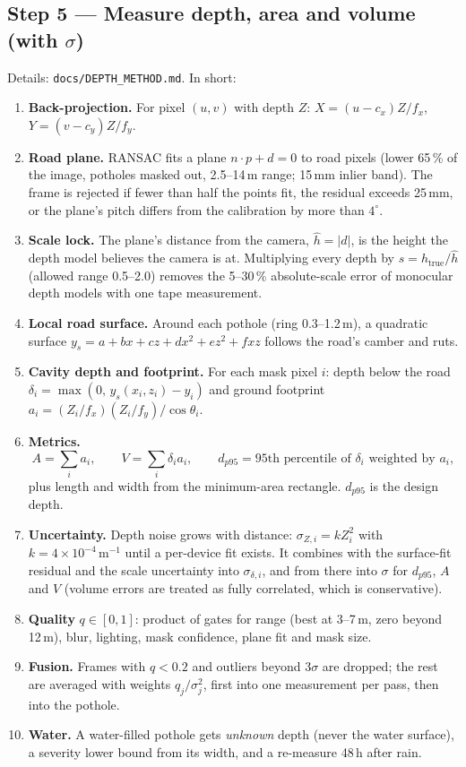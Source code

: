 \documentclass[11pt,a4paper]{article}
\newcommand{\code}[1]{\texttt{\small #1}}
\begin{document}
\subsection{Step 5 --- Measure depth, area and volume (with \texorpdfstring{$\sigma$}{sigma})}
Details: \code{docs/DEPTH\_METHOD.md}. In short:
\begin{enumerate}
  \item \textbf{Back-projection.} For pixel $(u,v)$ with depth $Z$: $X=(u-c_x)Z/f_x$, $Y=(v-c_y)Z/f_y$.
  \item \textbf{Road plane.} RANSAC fits a plane $n\cdot p + d = 0$ to road pixels (lower 65\,\% of the image, potholes
        masked out, 2.5--14\,m range; 15\,mm inlier band). The frame is rejected if fewer than half the points fit,
        the residual exceeds 25\,mm, or the plane's pitch differs from the calibration by more than $4^\circ$.
  \item \textbf{Scale lock.} The plane's distance from the camera, $\hat h=|d|$, is the height the depth model
        believes the camera is at. Multiplying every depth by $s=h_{\text{true}}/\hat h$ (allowed range 0.5--2.0)
        removes the 5--30\,\% absolute-scale error of monocular depth models with one tape measurement.
  \item \textbf{Local road surface.} Around each pothole (ring 0.3--1.2\,m), a quadratic surface
        $y_s=a+bx+cz+dx^2+ez^2+fxz$ follows the road's camber and ruts.
  \item \textbf{Cavity depth and footprint.} For each mask pixel $i$: depth below the road
        $\delta_i=\max(0,\,y_s(x_i,z_i)-y_i)$ and ground footprint $a_i=(Z_i/f_x)(Z_i/f_y)/\cos\theta_i$.
  \item \textbf{Metrics.}
        \[ A=\sum_i a_i,\qquad V=\sum_i \delta_i a_i,\qquad d_{p95}=\text{95th percentile of }\delta_i
           \text{ weighted by } a_i, \]
        plus length and width from the minimum-area rectangle. $d_{p95}$ is the design depth.
  \item \textbf{Uncertainty.} Depth noise grows with distance: $\sigma_{Z,i}=k Z_i^2$ with
        $k=4\times10^{-4}\,\text{m}^{-1}$ until a per-device fit exists. It combines with the surface-fit residual and
        the scale uncertainty into $\sigma_{\delta,i}$, and from there into $\sigma$ for $d_{p95}$, $A$ and
        $V$ (volume errors are treated as fully correlated, which is conservative).
  \item \textbf{Quality} $q\in[0,1]$: product of gates for range (best at 3--7\,m, zero beyond 12\,m), blur,
        lighting, mask confidence, plane fit and mask size.
  \item \textbf{Fusion.} Frames with $q<0.2$ and outliers beyond $3\sigma$ are dropped; the rest are averaged with
        weights $q_j/\sigma_j^2$, first into one measurement per pass, then into the pothole.
  \item \textbf{Water.} A water-filled pothole gets \emph{unknown} depth (never the water surface), a severity lower
        bound from its width, and a re-measure 48\,h after rain.
\end{enumerate}
\end{document}
